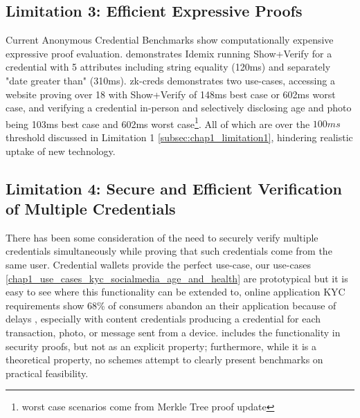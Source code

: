 \subsection{Limitation 3: Efficient Expressive Proofs}
Current Anonymous Credential Benchmarks show computationally expensive expressive proof evaluation. \cite{habib_evaluation_2016} demonstrates Idemix running Show+Verify for a credential with 5 attributes including string equality (120ms) and separately "date greater than" (310ms). zk-creds \cite{rosenberg_zk-creds_2022} demonstrates two use-cases, accessing a website proving over 18 with Show+Verify of 148ms best case or 602ms worst case, and verifying a credential in-person and selectively disclosing age and photo being 103ms best case and 602ms worst case\footnote{worst case scenarios come from Merkle Tree proof update}. All of which are over the $100ms$ threshold discussed in Limitation 1 \ref{subsec:chap1_limitation1}, hindering realistic uptake of new technology. 


\subsection{Limitation 4: Secure and Efficient Verification of Multiple Credentials}
There has been some consideration of the need to securely verify multiple credentials simultaneously while proving that such credentials come from the same user. Credential wallets provide the perfect use-case, our use-cases \ref{chap1_use_cases_kyc_socialmedia_age_and_health} are prototypical but it is easy to see where this functionality can be extended to, online application KYC requirements show 68\% of consumers abandon an their application because of delays \cite{signicat_battle_2022}, especially with content credentials \cite{c2paorg_content_2024} producing a credential for each transaction, photo, or message sent from a device. \cite{dunkelman_formal_2016} includes the functionality in security proofs, but not as an explicit property; furthermore, while it is a theoretical property, no schemes attempt to clearly present benchmarks on practical feasibility. 


